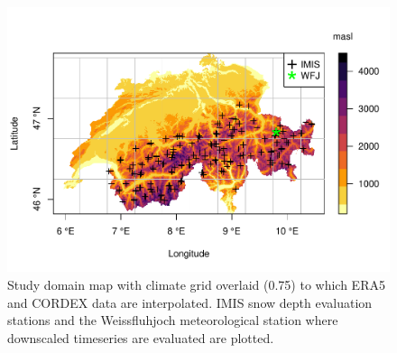 \documentclass[hess, manuscript]{copernicus}
\begin{document}













%
 \clearpage

\begin{figure}[t]
\includegraphics[width=18cm]{"plots/F1_map2.pdf"}
\caption{Study domain map with climate grid overlaid (0.75\degree) to which ERA5 and CORDEX data are interpolated. IMIS snow depth evaluation stations and the Weissfluhjoch meteorological station where downscaled timeseries are evaluated are plotted.}
\end{figure}
\end{document}
